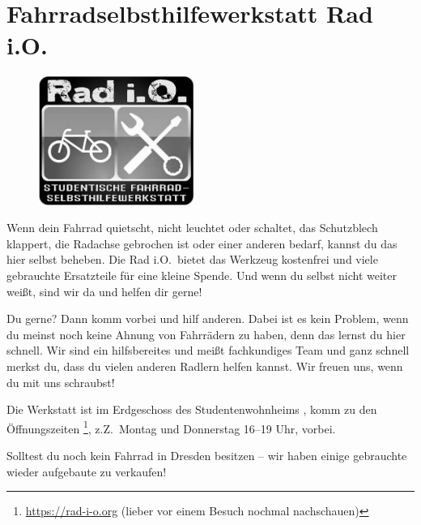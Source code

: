 \section*{Fahrradselbsthilfewerkstatt Rad i.O.}
\begin{figure}%
  \includegraphics[width=0.45\textwidth]{./radio-logo-gray.jpg}
\end{figure}
%
Wenn dein Fahrrad quietscht, nicht leuchtet oder schaltet, das Schutzblech klappert, die Radachse gebrochen ist oder einer anderen  bedarf, kannst du das hier selbst beheben.
Die Rad i.O.\ bietet das Werkzeug kostenfrei und viele gebrauchte Ersatzteile für eine kleine Spende.
Und wenn du selbst nicht weiter weißt, sind wir da und helfen dir gerne!

Du  gerne? Dann komm vorbei und hilf anderen. Dabei ist es kein Problem, wenn du meinst noch keine Ahnung von Fahrrädern zu haben, denn das lernst du hier schnell. Wir sind ein hilfsbereites und meißt fachkundiges Team und ganz schnell merkst du, dass du vielen anderen Radlern helfen kannst. Wir freuen uns, wenn du mit uns schraubst!

Die Werkstatt ist im Erdgeschoss des Studentenwohnheims , komm zu den Öffnungszeiten%
\footnote{\url{https://rad-i-o.org} (lieber vor einem Besuch nochmal nachschauen)}, z.Z.\ Montag und Donnerstag 16--19 Uhr, vorbei.

Solltest du noch kein Fahrrad in Dresden besitzen -- wir haben einige gebrauchte wieder aufgebaute zu verkaufen!
